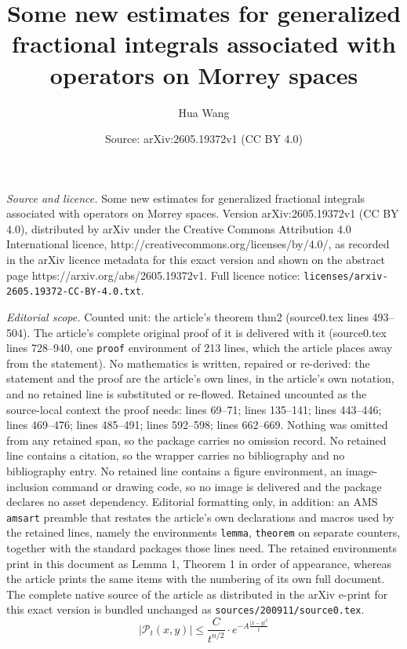 \documentclass[10pt,a4paper]{amsart}
\title{Some new estimates for generalized fractional integrals associated with operators on Morrey spaces}
\author{Hua Wang}
\date{Source: arXiv:2605.19372v1 (CC BY 4.0)}
\begin{document}
\maketitle

\noindent\emph{Source and licence.} Some new estimates for generalized fractional integrals associated with operators on Morrey spaces. Version arXiv:2605.19372v1 (CC BY 4.0), distributed by arXiv under the Creative Commons Attribution 4.0 International licence, http://creativecommons.org/licenses/by/4.0/, as recorded in the arXiv licence metadata for this exact version and shown on the abstract page https://arxiv.org/abs/2605.19372v1. Full licence notice: \texttt{licenses/arxiv-2605.19372-CC-BY-4.0.txt}.\par\smallskip

\noindent\textit{Editorial scope.} Counted unit: the article's theorem thm2 (source0.tex lines 493--504). The article's complete original proof of it is delivered with it (source0.tex lines 728--940, one \texttt{proof} environment of 213 lines, which the article places away from the statement). No mathematics is written, repaired or re-derived: the statement and the proof are the article's own lines, in the article's own notation, and no retained line is substituted or re-flowed.  Retained uncounted as the source-local context the proof needs: lines 69--71; lines 135--141; lines 443--446; lines 469--476; lines 485--491; lines 592--598; lines 662--669.  Nothing was omitted from any retained span, so the package carries no omission record.  No retained line contains a citation, so the wrapper carries no bibliography and no bibliography entry.  No retained line contains a figure environment, an image-inclusion command or drawing code, so no image is delivered and the package declares no asset dependency.  Editorial formatting only, in addition: an AMS \texttt{amsart} preamble that restates the article's own declarations and macros used by the retained lines, namely the environments \texttt{lemma}, \texttt{theorem} on separate counters, together with the standard packages those lines need.  The retained environments print in this document as Lemma 1, Theorem 1 in order of appearance, whereas the article prints the same items with the numbering of its own full document.  The complete native source of the article as distributed in the arXiv e-print for this exact version is bundled unchanged as \texttt{sources/200911/source0.tex}.
\begin{equation}\label{G}
\big|\mathcal{P}_t(x,y)\big|\leq\frac{C}{t^{n/2}}\cdot e^{-A\frac{|x-y|^2}{t}}
\end{equation}
\end{document}
